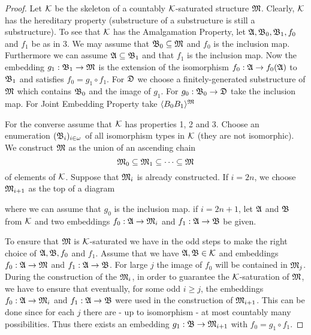\documentclass[11pt]{article}
\begin{document}
\begin{proof}
Let \(\mathcal{K}\) be the skeleton of a countably \(\mathcal{K}\)-saturated structure \(\mathfrak{M}\). Clearly, \(\mathcal{K}\) has the
hereditary property (substructure of a substructure is still a substructure).  To see that \(\mathcal{K}\)
has the Amalgamation Property, let \(\mathfrak{A},\mathfrak{B}_0,\mathfrak{B}_1,f_0\) and \(f_1\) be as in 3. We may assume
that \(\mathfrak{B}_0\subseteq\mathfrak{M}\) and \(f_0\) is the inclusion map. Furthermore we can assume \(\mathfrak{A}\subseteq\mathfrak{B}_1\) and
that \(f_1\) is the inclusion map. Now the embedding \(g_1:\mathfrak{B}_1\to\mathfrak{M}\) is the extension of the
isomorphism \(f_0:\mathfrak{A}\to f_0(\mathfrak{A})\) to \(\mathfrak{B}_1\) and satisfies \(f_0=g_1\circ f_1\). For \(\mathfrak{D}\) we choose a
finitely-generated substructure of \(\mathfrak{M}\) which contains \(\mathfrak{B}_0\) and the image of \(g_1\).
For \(g_0:\mathfrak{B}_0\to\mathfrak{D}\) take the inclusion map. For Joint Embedding Property take \(\langle B_0B_1\rangle^{\mathfrak{M}}\)

For the converse assume that \(\mathcal{K}\) has properties 1, 2 and 3. Choose an
enumeration \((\mathfrak{B}_i)_{i\in\omega}\) of all isomorphism types in \(\mathcal{K}\) (they are not isomorphic). We
construct \(\mathfrak{M}\) as the union of
an ascending chain
\begin{equation*}
\mathfrak{M}_0\subseteq\mathfrak{M}_1\subseteq\dots\subseteq\mathfrak{M}
\end{equation*}
of elements of \(\mathcal{K}\). Suppose that \(\mathfrak{M}_i\) is already constructed. If \(i=2n\), we
choose \(\mathfrak{M}_{i+1}\) as the top of a diagram
\begin{center}\end{center}
where we can assume that \(g_0\) is the inclusion map. if \(i=2n+1\), let \(\mathfrak{A}\) and \(\mathfrak{B}\)
from \(\mathcal{K}\) and two embeddings \(f_0:\mathfrak{A}\to\mathfrak{M}_i\) and \(f_1:\mathfrak{A}\to\mathfrak{B}\) be given.
\begin{center}\end{center}
To ensure that \(\mathfrak{M}\) is \(\mathcal{K}\)-saturated we have in the odd steps to make the right choice
of \(\mathfrak{A},\mathfrak{B},f_0\) and \(f_1\). Assume that we have \(\mathfrak{A},\mathfrak{B}\in\mathcal{K}\) and embeddings \(f_0:\mathfrak{A}\to\mathfrak{M}\)
and \(f_1:\mathfrak{A}\to\mathfrak{B}\). For large \(j\) the image of \(f_0\) will be contained in \(\mathfrak{M}_j\). During the
construction of the \(\mathfrak{M}_i\), in order to guarantee the \(\mathcal{K}\)-saturation of \(\mathfrak{M}\), we have to
ensure that eventually, for some odd \(i\ge j\), the embeddings \(f_0:\mathfrak{A}\to\mathfrak{M}_i\) and \(f_1:\mathfrak{A}\to\mathfrak{B}\) were
used in the construction of \(\mathfrak{M}_{i+1}\). This can be done since for each \(j\) there are - up to
isomorphism - at most countably many possibilities. Thus there exists an
embedding \(g_1:\mathfrak{B}\to\mathfrak{M}_{i+1}\) with \(f_0=g_1\circ f_1\).


\end{proof}
\end{document}
